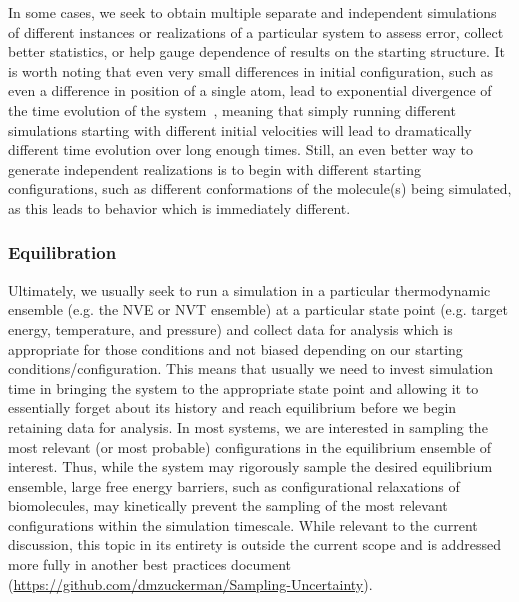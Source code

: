 \documentclass[9pt,bestpractices]{livecoms}
\begin{document}
In some cases, we seek to obtain multiple separate and independent simulations of different instances or realizations of a particular system to assess error, collect better statistics, or help gauge dependence of results on the starting structure.
It is worth noting that even very small differences in initial configuration, such as even a difference in position of a single atom, lead to exponential divergence of the time evolution of the system~\cite{allen_computer_2017}, meaning that simply running different simulations starting with different initial velocities will lead to dramatically different time evolution over long enough times.
Still, an even better way to generate independent realizations is to begin with different starting configurations, such as different conformations of the molecule(s) being simulated, as this leads to behavior which is immediately different.

\subsubsection{Equilibration}

Ultimately, we usually seek to run a simulation in a particular thermodynamic ensemble (e.g. the NVE or NVT ensemble) at a particular state point (e.g. target energy, temperature, and pressure) and collect data for analysis which is appropriate for those conditions and not biased depending on our starting conditions/configuration.
This means that usually we need to invest simulation time in bringing the system to the appropriate state point and allowing it to essentially forget about its history and reach equilibrium before we begin retaining data for analysis.
In most systems, we are interested in sampling the most relevant (or most probable) configurations in the equilibrium ensemble of interest.
Thus, while the system may rigorously sample the desired equilibrium ensemble, large free energy barriers, such as configurational relaxations of biomolecules, may kinetically prevent the sampling of the most relevant configurations within the simulation timescale.
While relevant to the current discussion, this topic in its entirety is outside the current scope and is addressed more fully in another best practices document (\url{https://github.com/dmzuckerman/Sampling-Uncertainty}). 
\end{document}
